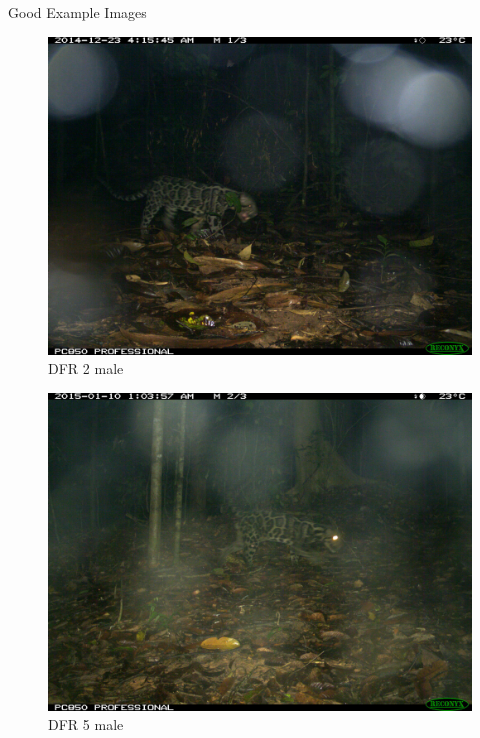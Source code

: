 \documentclass[10pt]{beamer}
\begin{document}

\begin{frame}{Good Example Images}		
	\centering
	\begin{minipage}[c]{0.48\linewidth}
		\begin{figure}
			\includegraphics[width=\linewidth,height=\textheight,keepaspectratio]{images/example_DFR_2_male.JPG}
			\caption{DFR 2 male}
		\end{figure}
	\end{minipage}
	\hfill
	\begin{minipage}[c]{0.48\linewidth}
		\begin{figure}
			\includegraphics[width=\linewidth,height=.8\textheight,keepaspectratio]{images/example_DFR_5_male.JPG}
			\caption{DFR 5 male}
		\end{figure}
	\end{minipage}
\end{frame}
\end{document}
